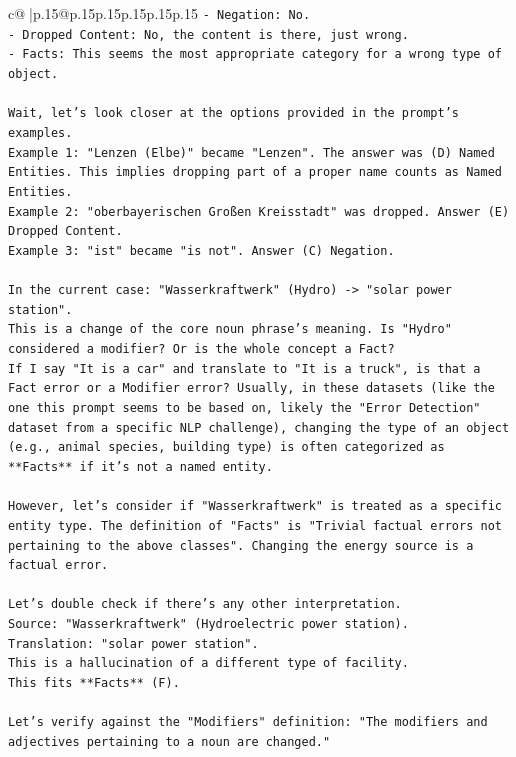 \documentclass{article}
\begin{document}
{\begin{supertabular}{c@{$\;$}|p{.15\linewidth}@{}p{.15\linewidth}p{.15\linewidth}p{.15\linewidth}p{.15\linewidth}p{.15\linewidth}}
{{{\texttt{{-} Negation: No.} \\
\texttt{{-} Dropped Content: No, the content is there, just wrong.} \\
\texttt{{-} Facts: This seems the most appropriate category for a wrong type of object.} \\
\\ 
\texttt{Wait, let's look closer at the options provided in the prompt's examples.} \\
\texttt{Example 1: "Lenzen (Elbe)" became "Lenzen". The answer was (D) Named Entities. This implies dropping part of a proper name counts as Named Entities.} \\
\texttt{Example 2: "oberbayerischen Großen Kreisstadt" was dropped. Answer (E) Dropped Content.} \\
\texttt{Example 3: "ist" became "is not". Answer (C) Negation.} \\
\\ 
\texttt{In the current case: "Wasserkraftwerk" (Hydro) {-}> "solar power station".} \\
\texttt{This is a change of the core noun phrase's meaning. Is "Hydro" considered a modifier? Or is the whole concept a Fact?} \\
\texttt{If I say "It is a car" and translate to "It is a truck", is that a Fact error or a Modifier error? Usually, in these datasets (like the one this prompt seems to be based on, likely the "Error Detection" dataset from a specific NLP challenge), changing the type of an object (e.g., animal species, building type) is often categorized as **Facts** if it's not a named entity.} \\
\\ 
\texttt{However, let's consider if "Wasserkraftwerk" is treated as a specific entity type. The definition of "Facts" is "Trivial factual errors not pertaining to the above classes". Changing the energy source is a factual error.} \\
\\ 
\texttt{Let's double check if there's any other interpretation.} \\
\texttt{Source: "Wasserkraftwerk" (Hydroelectric power station).} \\
\texttt{Translation: "solar power station".} \\
\texttt{This is a hallucination of a different type of facility.} \\
\texttt{This fits **Facts** (F).} \\
\\ 
\texttt{Let's verify against the "Modifiers" definition: "The modifiers and adjectives pertaining to a noun are changed."} \\
}}}
\end{supertabular}}
\end{document}
